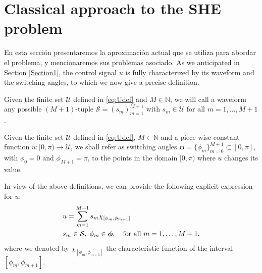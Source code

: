 
\section{Classical approach to the SHE problem}

En esta sección presentaremos la aproximación actual que se utiliza para abordar el problema, y mencionaremos sus problemas asociado. As we anticipated in Section \ref{Section1}, the control signal $u$ is fully characterized by its waveform and the switching angles, to which we now give a precise definition.
\newline
\begin{definition}\label{def:waveform}
Given the finite set $\mathcal U$ defined in \eqref{eq:Udef} and $M\in\mathbb{N}$, we will call a waveform any possible $(M+1)$-tuple $\mathcal S = (s_m)_{m=1}^{M+1}$ with $s_m\in \mathcal U$ for all $m=1,\ldots,M+1$.
\end{definition}
\vspace{1em}
\begin{definition}\label{def:switchingAngles}
Given the finite set $\mathcal U$ defined in \eqref{eq:Udef}, $M\in\mathbb{N}$ and a piece-wise constant function $u:[0,\pi) \rightarrow \mathcal{U}$, we shall refer as switching angles $\bm{\phi} = \{\phi_m\}_{m=0}^{M+1}\subset[0,\pi]$, with $\phi_0 = 0$ and $\phi_{M+1} = \pi$, to the points in the domain $[0,\pi)$ where $u$ changes its value. 
\end{definition}

In view of the above definitions, we can provide the following explicit expression for $u$:
\begin{align}\label{eq:uExpl}
	&u = \sum_{m=1}^{M+1} s_m\chi_{[\phi_m,\phi_{m+1}]}
	\\
	&s_m\in\mathcal S, \;\phi_m\in{\bm{\phi}}, \quad \mbox{for all } m=1,\ldots,M+1, \notag 
\end{align}
where we denoted by $\chi_{[\phi_m,\phi_{m+1}]}$ the characteristic function of the interval $[\phi_m,\phi_{m+1}]$.

